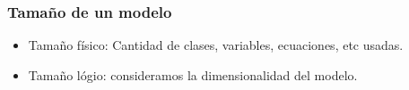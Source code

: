 \documentclass[aspectratio=169,10pt]{beamer}
\begin{document}
\begin{frame}[fragile]
\frametitle{Tama\~no de un modelo} 
\begin{itemize}
    \item Tama\~no f\'isico: Cantidad de clases, variables, ecuaciones, etc usadas.
    \item Tama\~no l\'ogio: consideramos la dimensionalidad del modelo.
\end{itemize}
 
\end{frame}




\end{document}
